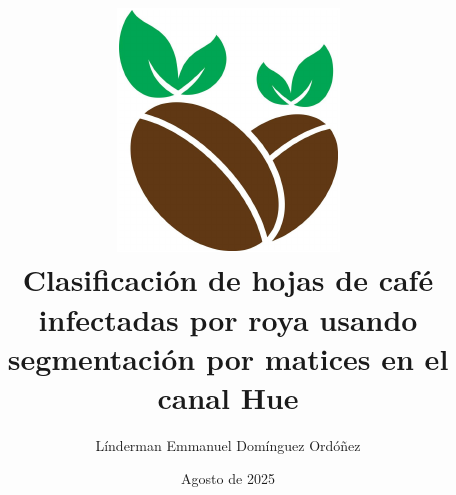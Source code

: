 \documentclass[10pt,letterpaper]{book}
\title{
\includegraphics[scale=0.7]{images/coffee_beans.png} \\\vspace{2em}
Clasificación de hojas de café infectadas por roya usando segmentación por matices en el canal Hue}
\author{Línderman Emmanuel Domínguez Ordóñez}
\date{Agosto de 2025}
\begin{document}
\renewcommand{\listtablename}{Índice de tablas}
\renewcommand{\tablename}{Tabla}
\maketitle
\frontmatter
\pagestyle{plain}
\tableofcontents
\listoflistings
\listoffigures
\listoftables
\mainmatter
\pagestyle{fancy}






\backmatter
\end{document}
